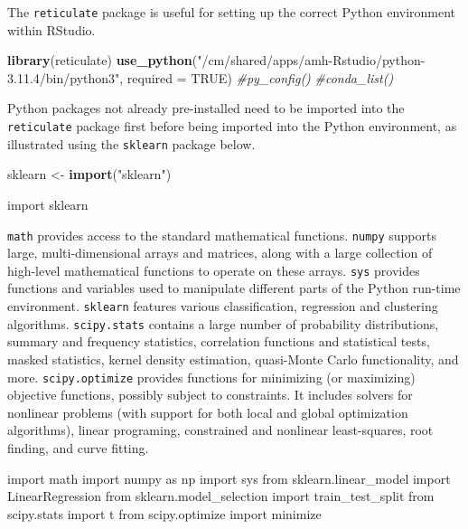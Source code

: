 \documentclass[12pt, twoside]{amherstthesis}
\newenvironment{Shaded}{\begin{snugshade}}{\end{snugshade}}
\newcommand{\AttributeTok}[1]{\textcolor[rgb]{0.13,0.29,0.53}{#1}}
\newcommand{\CommentTok}[1]{\textcolor[rgb]{0.56,0.35,0.01}{\textit{#1}}}
\newcommand{\ConstantTok}[1]{\textcolor[rgb]{0.56,0.35,0.01}{#1}}
\newcommand{\FunctionTok}[1]{\textcolor[rgb]{0.13,0.29,0.53}{\textbf{#1}}}
\newcommand{\ImportTok}[1]{#1}
\newcommand{\NormalTok}[1]{#1}
\newcommand{\OtherTok}[1]{\textcolor[rgb]{0.56,0.35,0.01}{#1}}
\newcommand{\StringTok}[1]{\textcolor[rgb]{0.31,0.60,0.02}{#1}}
\begin{document}
The \texttt{reticulate} package is useful for setting up the correct Python environment within RStudio.
\begin{Shaded}
\begin{Highlighting}[]
\FunctionTok{library}\NormalTok{(reticulate)}
\FunctionTok{use\_python}\NormalTok{(}\StringTok{"/cm/shared/apps/amh{-}Rstudio/python{-}3.11.4/bin/python3"}\NormalTok{, }
           \AttributeTok{required =} \ConstantTok{TRUE}\NormalTok{)}
\CommentTok{\#py\_config()}
\CommentTok{\#conda\_list()}
\end{Highlighting}
\end{Shaded}
\noindent Python packages not already pre-installed need to be imported into the \texttt{reticulate} package first before being imported into the Python environment, as illustrated using the \texttt{sklearn} package below.
\begin{Shaded}
\begin{Highlighting}[]
\NormalTok{sklearn }\OtherTok{\textless{}{-}} \FunctionTok{import}\NormalTok{(}\StringTok{"sklearn"}\NormalTok{)}
\end{Highlighting}
\end{Shaded}
\begin{Shaded}
\begin{Highlighting}[]
\ImportTok{import}\NormalTok{ sklearn}
\end{Highlighting}
\end{Shaded}
\noindent \texttt{math} provides access to the standard mathematical functions. \texttt{numpy} supports large, multi-dimensional arrays and matrices, along with a large collection of high-level mathematical functions to operate on these arrays. \texttt{sys} provides functions and variables used to manipulate different parts of the Python run-time environment. \texttt{sklearn} features various classification, regression and clustering algorithms. \texttt{scipy.stats} contains a large number of probability distributions, summary and frequency statistics, correlation functions and statistical tests, masked statistics, kernel density estimation, quasi-Monte Carlo functionality, and more. \texttt{scipy.optimize} provides functions for minimizing (or maximizing) objective functions, possibly subject to constraints. It includes solvers for nonlinear problems (with support for both local and global optimization algorithms), linear programing, constrained and nonlinear least-squares, root finding, and curve fitting.
\begin{Shaded}
\begin{Highlighting}[]
\ImportTok{import}\NormalTok{ math}
\ImportTok{import}\NormalTok{ numpy }\ImportTok{as}\NormalTok{ np}
\ImportTok{import}\NormalTok{ sys}
\ImportTok{from}\NormalTok{ sklearn.linear\_model }\ImportTok{import}\NormalTok{ LinearRegression}
\ImportTok{from}\NormalTok{ sklearn.model\_selection }\ImportTok{import}\NormalTok{ train\_test\_split}
\ImportTok{from}\NormalTok{ scipy.stats }\ImportTok{import}\NormalTok{ t}
\ImportTok{from}\NormalTok{ scipy.optimize }\ImportTok{import}\NormalTok{ minimize}
\end{Highlighting}
\end{Shaded}
\end{document}
